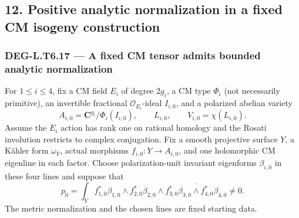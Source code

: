 \subsection{12. Positive analytic normalization in a fixed CM isogeny construction}\label{positive-analytic-normalization-in-a-fixed-cm-isogeny-construction}

\subsubsection{DEG-L.T6.17 --- A fixed CM tensor admits bounded analytic normalization}\label{DEG-L.T6.17}

For \(1\le i\le4\), fix a CM field \(E_i\) of degree \(2g_i\), a CM type \(\Phi_i\) (not necessarily primitive), an invertible fractional \(\mathcal O_{E_i}\)-ideal \(I_{i,0}\), and a polarized abelian variety \[
A_{i,0}=\mathbf C^{g_i}/\Phi_i(I_{i,0}),\qquad L_{i,0},\qquad
V_{i,0}=\chi(L_{i,0}).
\tag{T17.1}
\] Assume the \(E_i\) action has rank one on rational homology and the Rosati involution restricts to complex conjugation. Fix a smooth projective surface \(Y\), a Kähler form \(\omega_Y\), actual morphisms \(f_{i,0}:Y\to A_{i,0}\), and one holomorphic CM eigenline in each factor. Choose polarization-unit invariant eigenforms \(\beta_{i,0}\) in these four lines and suppose that \[
p_0=\int_Y f_{1,0}^*\beta_{1,0}\wedge f_{2,0}^*\beta_{2,0}
            \wedge\overline{f_{3,0}^*\beta_{3,0}\wedge f_{4,0}^*\beta_{4,0}}
\ne0.
\tag{T17.2}
\] The metric normalization and the chosen lines are fixed starting data.

